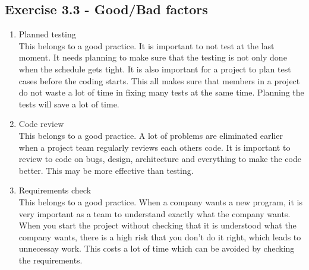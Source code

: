 \documentclass[10pt]{article}
\begin{document}
\subsection{Exercise 3.3 - Good/Bad factors}
\begin{enumerate}
\item Planned testing \hfill \\
This belongs to a good practice. It is important to not test at the last moment. It needs planning to make sure that the testing is not only done when the schedule gets tight. It is also important for a project to plan test cases before the coding starts. This all makes sure that members in a project do not waste a lot of time in fixing many tests at the same time. Planning the tests will save a lot of time.
\item Code review \hfill \\
This belongs to a good practice. A lot of problems are eliminated earlier when a project team regularly reviews each others code. It is important to review to code on bugs, design, architecture and everything to make the code better. This may be more effective than testing.
\item Requirements check \hfill \\
This belongs to a good practice. When a company wants a new program, it is very important as a team to understand exactly what the company wants. When you start the project without checking that it is understood what the company wants, there is a high risk that you don't do it right, which leads to unnecessay work. This costs a lot of time which can be avoided by checking the requirements.
\end{enumerate}
\end{document}
